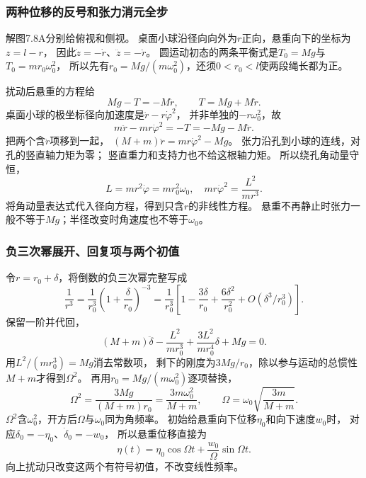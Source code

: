 \documentclass[UTF8,fontset=fandol,a4paper,11pt]{ctexart}
\begin{document}
\subsubsection*{两种位移的反号和张力消元全步}
解图7.8A分别给俯视和侧视。
桌面小球沿径向向外为$r$正向，悬重向下的坐标为$z=l-r$，
因此$\dot z=-\dot r$、$\ddot z=-\ddot r$。
圆运动初态的两条平衡式是$T_0=Mg$与$T_0=mr_0\omega_0^2$，
所以先有$r_0=Mg/(m\omega_0^2)$，还须$0<r_0<l$使两段绳长都为正。

扰动后悬重的方程给
\[
Mg-T=-M\ddot r,\qquad T=Mg+M\ddot r.
\]
桌面小球的极坐标径向加速度是$\ddot r-r\dot\varphi^2$，
并非单独的$-r\omega_0^2$，故
\[
m\ddot r-mr\dot\varphi^2=-T=-Mg-M\ddot r.
\]
把两个含$\ddot r$项移到一起，
$(M+m)\ddot r=mr\dot\varphi^2-Mg$。
张力沿孔到小球的连线，对孔的竖直轴力矩为零；
竖直重力和支持力也不给这根轴力矩。
所以绕孔角动量守恒，
\[
L=mr^2\dot\varphi=mr_0^2\omega_0,
\quad mr\dot\varphi^2=\frac{L^2}{mr^3}.
\]
将角动量表达式代入径向方程，得到只含$r$的非线性方程。
悬重不再静止时张力一般不等于$Mg$；半径改变时角速度也不等于$\omega_0$。

\subsubsection*{负三次幂展开、回复项与两个初值}
令$r=r_0+\delta$，将倒数的负三次幂完整写成
\[
\frac1{r^3}=\frac1{r_0^3}
\left(1+\frac\delta{r_0}\right)^{-3}
=\frac1{r_0^3}\left[1-\frac{3\delta}{r_0}
+\frac{6\delta^2}{r_0^2}+O(\delta^3/r_0^3)\right].
\]
保留一阶并代回，
\[
(M+m)\ddot\delta-
\frac{L^2}{mr_0^3}
+\frac{3L^2}{mr_0^4}\delta+Mg=0.
\]
用$L^2/(mr_0^3)=Mg$消去常数项，
剩下的刚度为$3Mg/r_0$，除以参与运动的总惯性$M+m$才得到$\Omega^2$。
再用$r_0=Mg/(m\omega_0^2)$逐项替换，
\[
\Omega^2=\frac{3Mg}{(M+m)r_0}
=\frac{3m\omega_0^2}{M+m},
\qquad \Omega=\omega_0\sqrt{\frac{3m}{M+m}}.
\]
$\Omega^2$含$\omega_0^2$，开方后$\Omega$与$\omega_0$同为角频率。
初始给悬重向下位移$\eta_0$和向下速度$w_0$时，
对应$\delta_0=-\eta_0$、$\dot\delta_0=-w_0$，
所以悬重位移直接为
\[
\eta(t)=\eta_0\cos\Omega t+\frac{w_0}{\Omega}\sin\Omega t.
\]
向上扰动只改变这两个有符号初值，不改变线性频率。
\end{document}
